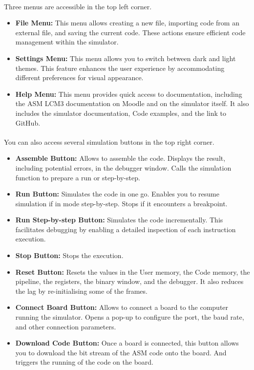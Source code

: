 \documentclass{article}
\begin{document}
\paragraph{}
Three menus are accessible in the top left corner.

\begin{itemize}
  \item \textbf{File Menu:} This menu allows creating a new file, importing code from an external file, and saving the current code. These actions ensure efficient code management within the simulator.
  \item \textbf{Settings Menu:} This menu allows you to switch between dark and light themes. This feature enhances the user experience by accommodating different preferences for visual appearance.
  \item \textbf{Help Menu:} This menu provides quick access to documentation, including the ASM LCM3 documentation on Moodle and on the simulator itself. It also includes the simulator documentation, Code examples, and the link to GitHub.
\end{itemize}

\paragraph{}
You can also access several simulation buttons in the top right corner.

\begin{itemize}
  \item \textbf{Assemble Button:} Allows to assemble the code. Displays the result, including potential errors, in the debugger window. Calls the simulation function to prepare a run or step-by-step.
  \item \textbf{Run Button:} Simulates the code in one go. Enables you to resume simulation if in mode step-by-step. Stops if it encounters a breakpoint.
  \item \textbf{Run Step-by-step Button:} Simulates the code incrementally. This facilitates debugging by enabling a detailed inspection of each instruction execution.
  \item \textbf{Stop Button:} Stops the execution.
  \item \textbf{Reset Button:} Resets the values in the User memory, the Code memory, the pipeline, the registers, the binary window, and the debugger. It also reduces the lag by re-initialising some of the frames.
  \item \textbf{Connect Board Button:} Allows to connect a board to the computer running the simulator. Opens a pop-up to configure the port, the baud rate, and other connection parameters.
  \item \textbf{Download Code Button:} Once a board is connected, this button allows you to download the bit stream of the ASM code onto the board. And triggers the running of the code on the board.
\end{itemize}
\end{document}
